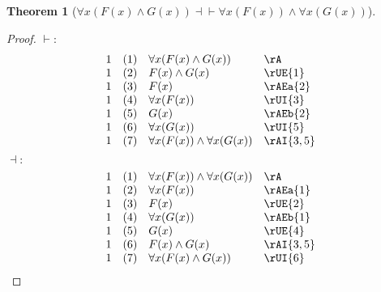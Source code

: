 \documentclass{book}
\theoremstyle{plain}
\newtheorem{theorem}{Theorem}
\theoremstyle{remark}
\theoremstyle{definition}
\begin{document}
\label{FaxLpFLpxRpAndGLpxRpRpEqvFaxLpFLpxRpRpAndFaxLpGLpxRpRp}
\begin{theorem}[\(\forall x(F(x)\land G(x))\dashv\vdash \forall x(F(x))\land \forall x(G(x))\)]
\end{theorem}
\begin{proof}
	\(\vdash:\)
	\[
	\begin{array}{llll}
		1 & (1) & \forall x(F(x)\land G(x)) & \rA \\
		1 & (2) &  F(x)\land G(x) & \rUE{1} \\	
		1 & (3) &  F(x) & \rAEa{2} \\
		1 & (4) &  \forall x(F(x)) & \rUI{3} \\	
		1 & (5) &  G(x) & \rAEb{2} \\
		1 & (6) &  \forall x(G(x)) & \rUI{5} \\
		1 & (7) &  \forall x(F(x))\land \forall x(G(x)) & \rAI{3,5} \\
	\end{array}
	\]
	\(\dashv:\)
	\[
	\begin{array}{llll}
		1 & (1) & \forall x(F(x))\land \forall x(G(x)) & \rA \\
		1 & (2) & \forall x(F(x)) & \rAEa{1} \\
		1 & (3) & F(x) & \rUE{2} \\
		1 & (4) & \forall x(G(x)) & \rAEb{1} \\
		1 & (5) & G(x) & \rUE{4} \\
		1 & (6) & F(x)\land G(x) & \rAI{3,5} \\
		1 & (7) & \forall x(F(x)\land G(x)) & \rUI{6} \\
	\end{array}
	\]
\end{proof}
\end{document}
